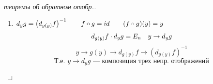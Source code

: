 \documentclass[main]{subfiles}
\begin{document}
\begin{proof} [теоремы об обратном отобр.]
\begin{enumerate}
			\[y,\ y + k \in V\]
			\begin{figure}[h!]
			\end{figure}
			\[y = f(x) \qq x = g(y)\]
			\[y + k = f(x + h) \q x + h = g(y + k)\]
			Докажем непр. на $V$:
			\[\Abs{\us{=h}{g(y + k) - g(y)}} = \Abs{h} \us{3\ (2b)}{\os{\text{по лемме}}{\leq}} \frac{1}{2\lambda}
				\Abs{\us{=f(x+h) - f(x)}{k}} \Ra g \text{ --- непр.}\]
			\[d_x f = A\]
			\[k = f(x + h) - f(x) = Ah + \alpha(h) \Abs{h} \q h \to 0\]
			\[A^{-1}k = h + A^{-1} (\alpha(h) \Abs{h})\]
			\[g(y + k) - g(y) - A^{-1}k = -A^{-1}(\alpha(h) \Abs{h}) \]
			\[\Abs{A^{-1}(\alpha(h) \Abs{h}) } \leq \Abs{A^{-1}} \cdot \abs{\us{< \E}{\alpha}} \Abs{h} \leq \]
			\[\leq \mathcal{E} \Abs{A^{-1}} \abs{h} \leq \mathcal{E} \Abs{A^{-1}} \frac{1}{2 \lambda}
				\Abs{k}\]
			\[\text{Т. о.}\q \lim_{k \to 0} \frac{\Abs{A^{-1}(\alpha \Abs{h}) }}{\Abs{k}} = 0\]
			\[f^{-1} \text{ --- непр. диф.? } \RLA \text{дифференциал --- непр., т.е.:}\]
			\[g = f^{-1} : V \to U_a, \q d_g : V \to \L (\R^n, \R^{2n} ) \q d_g \in C(V)\]
			\[\forall y \in V \q y \us{\text{непр.?}}{\to } d_{y} g \]
			\item $d_y g = \left(d_{g(y)} f \right)^{-1} \qquad f \circ g = id \qquad (f \circ g)(y) = y$
			\[d_{g(y)} f \cdot d_y g = E_n\quad y \to d_y g\]
			\[y \to g(y) \to d_{g(y)} f \to (d_{g(y)} f )^{-1}  \]
			\[\text{Т.е. } y \to d_y g \text{ --- композиция трех непр. отображений}\]
		\end{enumerate}
	\end{proof}
\end{document}
